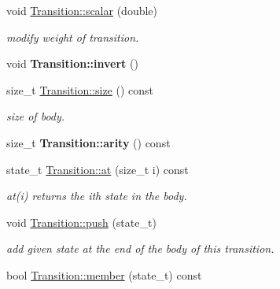 \begin{DoxyCompactItemize}
\item 
\mbox{\label{group__schemata_ga6d7e864cf11645e39e3999516c2438f7}} 
void \mbox{\hyperlink{group__schemata_ga6d7e864cf11645e39e3999516c2438f7}{Transition\+::scalar}} (double)
\begin{DoxyCompactList}\small\item\em modify weight of transition. \end{DoxyCompactList}\item 
\mbox{\label{group__schemata_ga00585e8726be305c0a0d5b9af9c585b0}} 
void {\bfseries Transition\+::invert} ()
\item 
\mbox{\label{group__schemata_ga743ca128dc509e129a49d66500a0f151}} 
size\+\_\+t \mbox{\hyperlink{group__schemata_ga743ca128dc509e129a49d66500a0f151}{Transition\+::size}} () const
\begin{DoxyCompactList}\small\item\em size of body. \end{DoxyCompactList}\item 
\mbox{\label{group__schemata_gad6ae5de36df4526b83bf7af59d178066}} 
size\+\_\+t {\bfseries Transition\+::arity} () const
\item 
state\+\_\+t \mbox{\hyperlink{group__schemata_ga9e2e243bfa147bafd947f2cffd1da3ec}{Transition\+::at}} (size\+\_\+t i) const
\begin{DoxyCompactList}\small\item\em at(i) returns the ith state in the body. \end{DoxyCompactList}\item 
\mbox{\label{group__schemata_gaacc3c061a48c15ce02b2ead05f9bb2bf}} 
void \mbox{\hyperlink{group__schemata_gaacc3c061a48c15ce02b2ead05f9bb2bf}{Transition\+::push}} (state\+\_\+t)
\begin{DoxyCompactList}\small\item\em add given state at the end of the body of this transition. \end{DoxyCompactList}\item 
\mbox{\label{group__schemata_gab94ff39ee66515e72c1c52ba855508c8}} 
bool \mbox{\hyperlink{group__schemata_gab94ff39ee66515e72c1c52ba855508c8}{Transition\+::member}} (state\+\_\+t) const

\end{DoxyCompactItemize}
